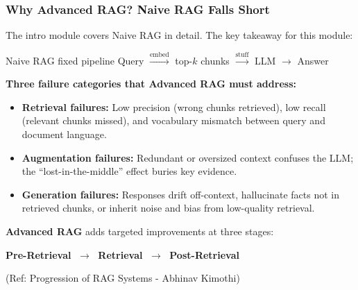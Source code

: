 \begin{frame}[fragile]\frametitle{Why Advanced RAG? Naive RAG Falls Short}

The intro module covers Naive RAG in detail. The key takeaway for this module:

\begin{block}{Naive RAG fixed pipeline}
\small
Query $\xrightarrow{\text{embed}}$ top-$k$ chunks $\xrightarrow{\text{stuff}}$ LLM $\rightarrow$ Answer
\end{block}

\vspace{0.3em}
\textbf{Three failure categories that Advanced RAG must address:}

\begin{itemize}
  \item \textbf{Retrieval failures:} Low precision (wrong chunks retrieved), low recall (relevant chunks missed), and vocabulary mismatch between query and document language.
  \item \textbf{Augmentation failures:} Redundant or oversized context confuses the LLM; the ``lost-in-the-middle'' effect buries key evidence.
  \item \textbf{Generation failures:} Responses drift off-context, hallucinate facts not in retrieved chunks, or inherit noise and bias from low-quality retrieval.
\end{itemize}

\vspace{0.3em}
\textbf{Advanced RAG} adds targeted improvements at three stages:

\begin{center}
\Large
\textbf{Pre-Retrieval} $\;\longrightarrow\;$ \textbf{Retrieval} $\;\longrightarrow\;$ \textbf{Post-Retrieval}
\end{center}

{\tiny (Ref: Progression of RAG Systems - Abhinav Kimothi)}

\end{frame}


